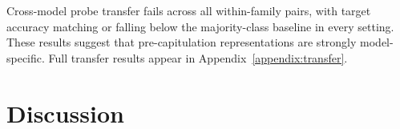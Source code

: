 \documentclass[11pt]{article}
\begin{document}
  Cross-model probe transfer fails across all within-family pairs, with
target accuracy matching or falling below the majority-class baseline
in every setting. These results suggest that pre-capitulation
representations are strongly model-specific. Full transfer results
appear in Appendix~\ref{appendix:transfer}.




\section{Discussion}
\label{sec:discussion}
\end{document}
